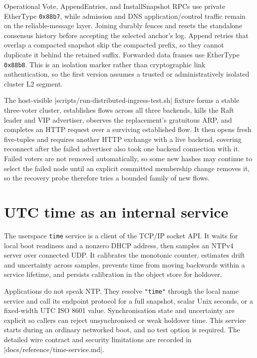 Operational Vote, AppendEntries, and InstallSnapshot RPCs use private
EtherType \texttt{0x88b7}, while admission and DNS application/control traffic
remain on the reliable-message layer. Joining durably fences and resets the
standalone consensus history before accepting the selected anchor's log.
Append retries that overlap a compacted snapshot skip the compacted prefix, so
they cannot duplicate it behind the retained suffix. Forwarded data frames use
EtherType \texttt{0x88b8}. This is an isolation marker rather than
cryptographic link authentication, so the first version assumes a trusted or
administratively isolated cluster L2 segment.

The host-visible \repofile|scripts/run-distributed-ingress-test.sh| fixture
forms a stable three-voter cluster, establishes flows across all three
backends, kills the Raft leader and VIP advertiser, observes the replacement's
gratuitous ARP, and completes an HTTP request over a surviving established
flow. It then opens fresh five-tuples and requires another HTTP exchange with a
live backend, covering reconnect after the failed advertiser also took one
backend connection with it. Failed voters are not removed automatically, so
some new hashes may continue to select the failed node until an explicit
committed membership change removes it, so the recovery probe therefore tries a
bounded family of new flows.

\section{UTC time as an internal service}

The userspace \texttt{time} service is a client of the TCP/IP socket API. It
waits for local boot readiness and a nonzero DHCP address, then samples an NTPv4
server over connected UDP. It calibrates the monotonic counter, estimates drift
and uncertainty across samples, prevents time from moving backwards within a
service lifetime, and persists calibration in the object store for holdover.

Applications do not speak NTP. They resolve \texttt{"time"} through the local
name service and call its endpoint protocol for a full snapshot, scalar Unix
seconds, or a fixed-width UTC ISO 8601 value. Synchronisation state and
uncertainty are explicit so callers can reject unsynchronised or weak holdover
time. This service starts during an ordinary networked boot, and no test option is
required. The detailed wire contract and security limitations are recorded in
\repofile|docs/reference/time-service.md|.

